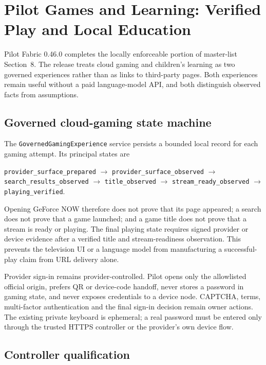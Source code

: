 \section{Pilot Games and Learning: Verified Play and Local Education}

Pilot Fabric 0.46.0 completes the locally enforceable portion of master-list
Section~8.  The release treats cloud gaming and children's learning as two governed
experiences rather than as links to third-party pages.  Both experiences remain useful
without a paid language-model API, and both distinguish observed facts from assumptions.

\subsection{Governed cloud-gaming state machine}

The \texttt{GovernedGamingExperience} service persists a bounded local record for each
gaming attempt.  Its principal states are
\begin{center}
\texttt{provider\_surface\_prepared} $\rightarrow$
\texttt{provider\_surface\_observed} $\rightarrow$
\texttt{search\_results\_observed} $\rightarrow$
\texttt{title\_observed} $\rightarrow$
\texttt{stream\_ready\_observed} $\rightarrow$
\texttt{playing\_verified}.
\end{center}
Opening GeForce NOW therefore does not prove that its page appeared; a search does not
prove that a game launched; and a game title does not prove that a stream is ready or
playing.  The final playing state requires signed provider or device evidence after a
verified title and stream-readiness observation.  This prevents the television UI or a
language model from manufacturing a successful-play claim from URL delivery alone.

Provider sign-in remains provider-controlled.  Pilot opens only the allowlisted official
origin, prefers QR or device-code handoff, never stores a password in gaming state, and
never exposes credentials to a device node.  CAPTCHA, terms, multi-factor authentication
and the final sign-in decision remain owner actions.  The existing private keyboard is
ephemeral; a real password must be entered only through the trusted HTTPS controller or
the provider's own device flow.

\subsection{Controller qualification}


